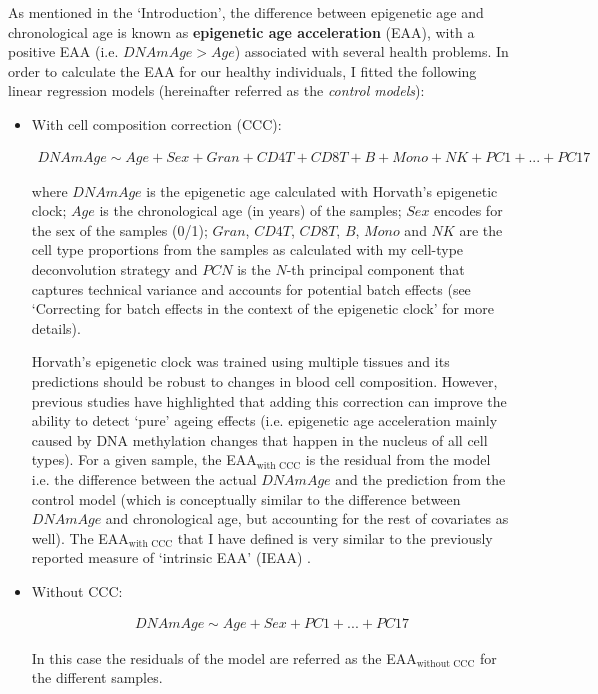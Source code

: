 As mentioned in the `Introduction', the difference between epigenetic age and chronological age is known as \textbf{epigenetic age acceleration} (\acrshort{EAA}), with a positive EAA (i.e. $DNAmAge > Age$) associated with several health problems. In order to calculate the EAA for our healthy individuals, I fitted the following linear regression models (hereinafter referred as the \textit{control models}):

\begin{itemize}
	
	\item With cell composition correction (CCC):
	
	\begin{align}
	 DNAmAge \sim Age + Sex+ Gran + CD4T + CD8T + B + Mono + NK + PC1 + ... + PC17
	\end{align}
	
	where $DNAmAge$ is the epigenetic age calculated with Horvath's epigenetic clock; $Age$ is the chronological age (in years) of the samples; $Sex$ encodes for the sex of the samples (0/1); $Gran$, $CD4T$, $CD8T$, $B$, $Mono$ and $NK$ are the cell type proportions from the samples as calculated with my cell-type deconvolution strategy and $PCN$ is the $N$-th principal component that captures technical variance and accounts for potential batch effects (see `Correcting for batch effects in the context of the epigenetic clock' for more details). 
	
	Horvath's epigenetic clock was trained using multiple tissues and its predictions should be robust to changes in blood cell composition. However, previous studies have highlighted that adding this correction can improve the ability to detect `pure' ageing effects \cite{Horvath2016, Chen2016} (i.e. epigenetic age acceleration mainly caused by DNA methylation changes that happen in the nucleus of all cell types). For a given sample, the EAA$_{\text{with CCC}}$ is the residual from the model i.e. the difference between the actual $DNAmAge$ and the prediction from the control model (which is conceptually similar to the difference between $DNAmAge$ and chronological age, but accounting for the rest of covariates as well). The EAA$_{\text{with CCC}}$ that I have defined is very similar to the previously reported measure of `intrinsic EAA' (\acrshort{IEAA}) \cite{Horvath2016, Chen2016}.
	
	\item Without CCC:
	
	\begin{align}
	DNAmAge \sim Age + Sex+ PC1 + ... + PC17
	\end{align}
	
	In this case the residuals of the model are referred as the EAA$_{\text{without CCC}}$ for the different samples.
	
\end{itemize}


